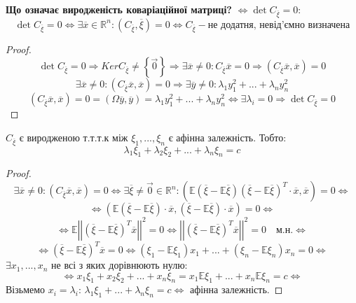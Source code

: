 \documentclass[fontsize=14pt,a4paper]{scrartcl}
\theoremstyle{definition}
\theoremstyle{remark}
\theoremstyle{definition}
\theoremstyle{definition}
\begin{document}
\textbf{Що означає виродженість коваріаційної матриці?} $ \Leftrightarrow \det C_{ \overline{\xi}} = 0$:
$$
\det C_{ \overline{\xi}} = 0 \Leftrightarrow \exists \overline{x} \in \mathbb{R}^n: \left( C_{\overline{\xi}}, \overline{\xi} \right) = 0
\Leftrightarrow C_{ \overline{\xi}} - \text{не додатня, невід'ємно визначена}
$$
\begin{proof}
$$
\det C_{ \overline{\xi}} = 0 \Rightarrow Ker C_{ \overline{\xi}} \neq \left\lbrace \vec{0} \right\rbrace \Rightarrow \exists \overline{x} \neq 0: C_{ \overline{\xi}} \overline{x} = 0\Rightarrow \left( C_{\overline{\xi}} \overline{x}, \overline{x} \right) = 0
$$
$$
\exists \overline{x} \neq 0: \left( C_{\overline{\xi}} \overline{x}, \overline{x} \right) = 0 \Rightarrow \exists \overline{y} \neq 0: \lambda_1 y_1^2 + ... + \lambda_n y_n^2
$$
$$
\left( C_{\overline{\xi}} \overline{x}, \overline{x} \right) = 0 = \left( \Omega \overline{y}, \overline{y} \right) = \lambda_1 y_1^2 + ... + \lambda_n y_n^2\Leftrightarrow \exists \lambda_i = 0 \Rightarrow \det C_{ \overline{\xi}} = 0
$$
\end{proof}
\begin{boxteo}
	$C_{\overline{\xi}}$ є виродженою т.т.т.к між $ \xi_1, ... , \xi_n$ є афінна залежність. Тобто:
	$$\lambda_1 \xi_1 + \lambda_2 \xi_2 +...+ \lambda_n \xi_n = c$$
\end{boxteo}
\begin{proof}
 $$
\exists \overline{x} \neq 0: \left( C_{\overline{\xi}} \overline{x}, \overline{x} \right) = 0 \Leftrightarrow \exists \overline{ \xi} \neq \vec{0} \in \mathbb{R}^n: \left( \mathbb{E}( \overline{\xi} - \mathbb{E}\overline{\xi})(\overline{\xi} - \mathbb{E} \overline{\xi})^T \cdot \overline{x}, \overline{x} \right) = 0 \Leftrightarrow
 $$
 $$
\Leftrightarrow  \left( \mathbb{E}( \overline{\xi} - \mathbb{E}\overline{\xi}) \cdot \overline{x},(\overline{\xi} - \mathbb{E} \overline{\xi})\cdot \overline{x} \right) = 0 \Leftrightarrow
 $$
 $$
 \Leftrightarrow \mathbb{E} \left| \left|  \left( \overline{\xi} - \mathbb{E}\overline{\xi} \right)^T \overline{x}  \right|  \right|^2 = 0 \Leftrightarrow \left| \left|  \left( \overline{\xi} - \mathbb{E}\overline{\xi} \right)^T \overline{x}  \right|  \right|^2 = 0 \quad \text{м.н.}
\Leftrightarrow $$
$$
\Leftrightarrow\left( \overline{\xi} - \mathbb{E}\overline{\xi} \right)^T \overline{x} = 0 \Leftrightarrow \left( \xi_1 - \mathbb{E} \xi_1 \right) x_1 + ... + (\xi_n - \mathbb{E}\xi_n) x_n = 0 \Leftrightarrow
$$
$ \exists x_1, ..., x_n$ не всі з яких дорівнюють нулю:
$$
\Leftrightarrow
x_1 \xi_1 + x_2 \xi_2 + ... + x_n \xi_n  = x_1 \mathbb{E}\xi_1 + ... + x_n \mathbb{E}\xi_n = c
\Leftrightarrow
$$
Візьмемо $ x_i = \lambda_i$: $ \lambda_1 \xi_1 + ... + \lambda_n \xi_n = c \Leftrightarrow$ афінна залежність.
\end{proof}
\end{document}
